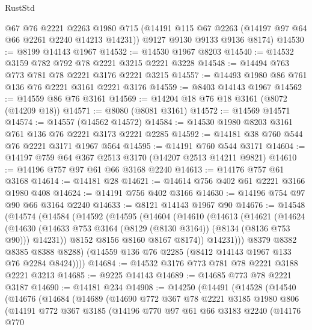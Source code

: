 \begin{lexlean}{RustStd}
\begin{coremodule}
      @67
      @76
      @2221
      @2263
      @1980
      @715
      (@14191 @115 @67 @2263 (@14197 @97 @64 @66 @2261 @2240 @14213 @14231))
      @9127
      @9130
      @9133
      @9136
      @8174)
@14530 := @8199 @14143 @1967
@14532 := @14530 @1967 @8203
@14540 := @14532 @3159 @782 @792 @78 @2221 @3215 @2221 @3228
@14548 := @14494 @763 @773 @781 @78 @2221 @3176 @2221 @3215
@14557 := @14493 @1980 @86 @761 @136 @76 @2221 @3161 @2221 @3176
@14559 := @8403 @14143 @1967
@14562 := @14559 @86 @76 @3161
@14569 := @14204 @18 @76 @18 @3161 (@8072 (@14209 @18))
@14571 := @8080 (@8081 @3161)
@14572 := @14569 @14571
@14574 := @14557 (@14562 @14572)
@14584 := @14530 @1980 @8203 @3161 @761 @136 @76 @2221 @3173 @2221 @2285
@14592 := @14181 @38 @760 @544 @76 @2221 @3171 @1967 @564
@14595 := @14191 @760 @544 @3171
@14604 := @14197 @759 @64 @367 @2513 @3170 (@14207 @2513 @14211 @9821)
@14610 := @14196 @757 @97 @61 @66 @3168 @2240
@14613 := @14176 @757 @61 @3168
@14614 := @14181 @28
@14621 := @14614 @756 @402 @61 @2221 @3166 @1980 @408
@14624 := @14191 @756 @402 @3166
@14630 := @14196 @754 @97 @90 @66 @3164 @2240
@14633 := @8121 @14143 @1967 @90
@14676 := @14548
    (@14574
      (@14584
        (@14592
          (@14595
            (@14604
              (@14610
                (@14613
                  (@14621
                    (@14624
                      (@14630
                        (@14633 @753 @3164 (@8129 (@8130 @3164)) (@8134 (@8136 @753 @90)))
                        @14231))
                    @8152
                    @8156
                    @8160
                    @8167
                    @8174))
                @14231)))
          @8379
          @8382
          @8385
          @8388
          @8288)
        (@14559 @136 @76 @2285 (@8412 @14143 @1967 @133 @76 @2284 @8424))))
@14684 := @14532 @3176 @773 @781 @78 @2221 @3188 @2221 @3213
@14685 := @9225 @14143
@14689 := @14685 @773 @78 @2221 @3187
@14690 := @14181 @234
@14908 := @14250
    (@14491
      (@14528
        (@14540
          (@14676
            (@14684
              (@14689
                (@14690
                  @772
                  @367
                  @78
                  @2221
                  @3185
                  @1980
                  @806
                  (@14191
                    @772
                    @367
                    @3185
                    (@14196
                      @770
                      @97
                      @61
                      @66
                      @3183
                      @2240
                      (@14176
                        @770

\end{coremodule}
\end{lexlean}
